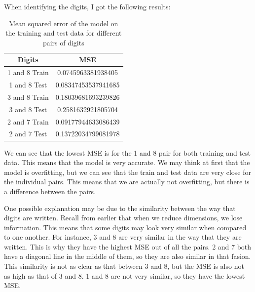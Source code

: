 \documentclass[11pt]{amsart}
\begin{document}
When identifying the digits, I got the following results:
\begin{table}[htp]
    \centering
    \begin{tabular}{|c|c|}
         \hline
         Digits & MSE \\ \hline
         1 and 8 Train & 0.0745963381938405 \\ \hline
         1 and 8 Test & 0.08347453537941685  \\ \hline
         3 and 8 Train & 0.18039681693239826  \\ \hline
         3 and 8 Test & 0.2581632921805704  \\ \hline
         2 and 7 Train & 0.09177944633086439  \\ \hline
         2 and 7 Test & 0.13722034799081978  \\ \hline
    \end{tabular}
    \caption{Mean squared error of the model on the training and test data for different pairs of digits}
    \label{tab:mse-table}
\end{table}

We can see that the lowest MSE is for the 1 and 8 pair for both training and test data. 
This means that the model is very accurate. We may think at first that the model is overfitting,
but we can see that the train and test data are very close for the individual pairs. This means that 
we are actually not overfitting, but there is a difference between the pairs. 

One possible explanation may be due to the similarity between the way that digits are written. Recall from 
earlier that when we reduce dimensions, we lose information. This means that some digits may look 
very similar when compared to one another. For instance, 3 and 8 are very similar in the way that they are written. 
This is why they have the highest MSE out of all the pairs. 2 and 7 both have a diagonal line in the middle 
of them, so they are also similar in that fasion. This similarity is not as clear as that between 3 and 8, but the MSE is 
also not as high as that of 3 and 8. 1 and 8 are not very similar, so they have the lowest MSE.


\end{document}
